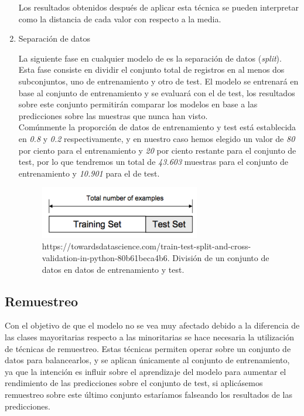 \begin{enumerate}
                    Los resultados obtenidos después de aplicar esta técnica se pueden interpretar como la distancia de cada valor con respecto a la media.

                \item Separación de datos

                    La siguiente fase en cualquier modelo de  es la separación de datos (\textit{split}). Esta fase consiste en dividir el conjunto total de registros en al menos dos subconjuntos, uno de entrenamiento y otro de test. El modelo se entrenará en base al conjunto de entrenamiento y se evaluará con el de test, los resultados sobre este conjunto permitirán comparar los modelos en base a las predicciones sobre las muestras que nunca han visto.\\


                    Comúnmente la proporción de datos de entrenamiento y test está establecida en \textit{0.8} y \textit{0.2} respectivamente, y en nuestro caso hemos elegido un valor de \textit{80} por ciento para el entrenamiento y \textit{20} por ciento restante para el conjunto de test, por lo que tendremos un total de \textit{43.603} muestras para el conjunto de entrenamiento y \textit{10.901} para el de test.


                    \begin{figure}[h]
                        \centering
                        \includegraphics[width=7cm]{archivos/4.Metodologia/Datos/Separacion/DataSplit}
                        \caption{https://towardsdatascience.com/train-test-split-and-cross-validation-in-python-80b61beca4b6. División de un conjunto de datos en datos de entrenamiento y test.}
                        \label{DataSplitImage}
                     \end{figure}

            \end{enumerate}



        \subsection{Remuestreo}


            Con el objetivo de que el modelo no se vea muy afectado debido a la diferencia de las clases mayoritarias respecto a las minoritarias se hace necesaria la utilización de técnicas de remuestreo. Estas técnicas permiten operar sobre un conjunto de datos para balancearlos, y se aplican únicamente al conjunto de entrenamiento, ya que la intención  es influir sobre el aprendizaje del modelo para aumentar el rendimiento de las predicciones sobre el conjunto de test, si aplicásemos remuestreo sobre este último conjunto estaríamos falseando los resultados de las predicciones.



